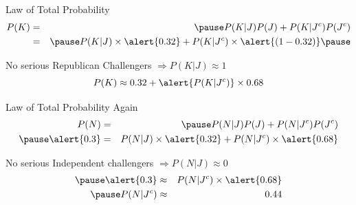 \documentclass[handout]{beamer}
\begin{document}
\begin{frame}
\normalsize
\vspace{1em}

\begin{block}{Law of Total Probability }
\begin{eqnarray*}
	P(K) &=& \pause P(K|J)P(J) + P(K|J^c)P(J^c)\\
		&=&\pause P(K|J)  \times \alert{0.32} + P(K|J^c) \times \alert{(1 - 0.32)} \pause
\end{eqnarray*}
\end{block}
\begin{block}{No serious Republican Challengers $\Rightarrow P(K|J) \approx 1$}\pause
	$$P(K) \approx 0.32 + \alert{P(K|J^c)} \times 0.68$$
\end{block}
\end{frame}
\begin{frame}
\normalsize
\vspace{1em}

\begin{block}{Law of Total Probability Again}
	\begin{eqnarray*}
	P(N) &=& \pause P(N|J)P(J) + P(N|J^c)P(J^c)\\ \pause
	\alert{0.3} &=& P(N|J)\times \alert{0.32} + P(N|J^c)\times \alert{0.68}\\
	\end{eqnarray*}
\end{block}\pause
\begin{block}{No serious Independent challengers $\Rightarrow P(N|J) \approx 0$}
\begin{eqnarray*}\pause
	\alert{0.3} &\approx&  P(N|J^c)\times \alert{0.68}\\ \pause
	P(N|J^c) &\approx& 0.44
	\end{eqnarray*}
\end{block}
\end{frame}
\end{document}
